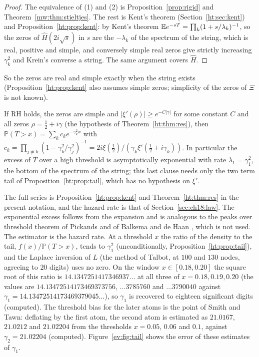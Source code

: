 \begin{proof}
The equivalence of (1) and (2) is Proposition~\ref{prop:rigid} and Theorem~\ref{mw:thm:stieltjes}. The rest is Kent's theorem (Section~\ref{ht:sec:kent}) and Proposition~\ref{ht:prop:kent}: by Kent's theorem $\mathbb{E} e^{-sT}=\prod_k(1+s/\lambda_k)^{-1}$, so the zeros of $\widehat H(2i\sqrt s)$ in $s$ are the $-\lambda_k$ of the spectrum of the string, which is real, positive and simple, and conversely simple real zeros give strictly increasing $\gamma_k^2$ and Krein's converse a string. The same argument covers $\widehat H$.
\end{proof}

So the zeros are real and simple exactly when the string exists (Proposition~\ref{ht:prop:kent} also assumes simple zeros; simplicity of the zeros of $\Xi$ is not known).

\begin{proposition}\label{ev:prop:tail}
If RH holds, the zeros are simple and $|\xi'(\rho)|\ge e^{-C|\gamma|}$ for some constant $C$ and all zeros $\rho=\frac12+i\gamma$ (the hypothesis of Theorem~\ref{ht:thm:res}), then $\mathbb{P}(T > x) = \sum_k c_ke^{-\gamma_k^2x}$ with $c_k = \prod_{j\ne k}(1 - \gamma_k^2/\gamma_j^2)^{-1} = 2i\xi(\tfrac12)/(\gamma_k\xi'(\tfrac12 + i\gamma_k))$. In particular the excess of $T$ over a high threshold is asymptotically exponential with rate $\lambda_1 = \gamma_1^2$, the bottom of the spectrum of the string; this last clause needs only the two term tail of Proposition~\ref{ht:prop:tail}, which has no hypothesis on $\xi'$.
\end{proposition}

The full series is Proposition~\ref{ht:prop:kent} and Theorem~\ref{ht:thm:res} in the present notation, and the hazard rate is that of Section~\ref{sec:ch18:law}. The exponential excess follows from the expansion and is analogous to the peaks over threshold theorem of Pickands and of Balkema and de Haan \cite{Pickands75,BalkemaDeHaan74}, which is not used. The estimator is the hazard rate. At a threshold $x$ the ratio of the density to the tail, $f(x)/\mathbb{P}(T>x)$, tends to $\gamma_1^2$ (unconditionally, Proposition~\ref{ht:prop:tail}), and the Laplace inversion of $L$ (the method of Talbot, at $100$ and $130$ nodes, agreeing to $20$ digits) uses no zero. On the window $x\in[0.18,0.20]$ the square root of this ratio is $14.1347251417346937\ldots$ at all three of $x=0.18,0.19,0.20$ (the values are $14.13472514173469373756$, $\ldots3785760$ and $\ldots3790040$ against $\gamma_1=14.13472514173469379045\ldots$), so $\gamma_1$ is recovered to eighteen significant digits (computed). The threshold bias for the later atoms is the point of Smith and Tawn: deflating by the first atom, the second atom is estimated as $21.0167$, $21.0212$ and $21.02204$ from the thresholds $x=0.05$, $0.06$ and $0.1$, against $\gamma_2=21.02204$ (computed). Figure~\ref{ev:fig:tail} shows the error of these estimates of $\gamma_1$.

